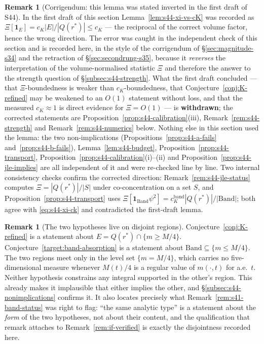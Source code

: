 \documentclass[11pt]{article}
\theoremstyle{definition}
\newtheorem{remark}[theorem]{Remark}
\theoremstyle{remark}
\begin{document}
\begin{remark}[Corrigendum: this lemma was stated inverted in the first draft
  of S44]\label{rem:s44-corrigendum}
  In the first draft of this section Lemma~\ref{lem:s44-xi-vs-cK} was recorded
  as $\Xi[\mathbf{1}_E]=c_K|E|/|Q(r^*)|\leq c_K$ --- the reciprocal of the
  correct volume factor, hence the wrong direction. The error was caught in
  the independent check of this section and is recorded here, in the style of
  the corrigendum of \S\ref{sec:magnitude-s34} and the retraction of
  \S\ref{sec:secondrung-s35}, because it \emph{reverses} the interpretation of
  the volume-normalised statistic $\Xi$ and therefore the answer to the
  strength question of \S\ref{subsec:s44-strength}. What the first draft
  concluded --- that $\Xi$-boundedness is weaker than $c_K$-boundedness, that
  Conjecture~\ref{conj:K-refined} may be weakened to an $O(1)$ statement
  without loss, and that the measured $c_K\approx1$ is direct evidence for
  $\Xi=O(1)$ --- is \textbf{withdrawn}; the corrected statements are
  Proposition~\ref{prop:s44-calibration}(iii),
  Remark~\ref{rem:s44-strength} and Remark~\ref{rem:s44-numerics} below.
  Nothing else in this section used the lemma: the two non-implications
  (Propositions~\ref{prop:s44-a-fails} and~\ref{prop:s44-b-fails}),
  Lemma~\ref{lem:s44-budget}, Proposition~\ref{prop:s44-transport},
  Proposition~\ref{prop:s44-calibration}(i)--(ii) and
  Proposition~\ref{prop:s44-jle-implies} are all independent of it and were
  re-checked line by line. Two internal consistency checks confirm the
  corrected direction: Remark~\ref{rem:s44-jle-status} computes
  $\Xi=|Q(r^*)|/|S|$ under co-concentration on a set $S$, and
  Proposition~\ref{prop:s44-transport} uses
  $\Xi[\mathbf{1}_{\mathrm{Band}}\psi^2]
  =c_K^{\mathrm{band}}|Q(r^*)|/|\mathrm{Band}|$; both agree with
  \eqref{eq:s44-xi-ck} and contradicted the first-draft lemma.
\end{remark}

\begin{remark}[The two hypotheses live on disjoint regions]
  \label{rem:s44-disjoint}
  Conjecture~\ref{conj:K-refined} is a statement about
  $E=Q(r^*)\cap\{m\geq M/4\}$. Conjecture~\ref{target:band-absorption} is a
  statement about $\mathrm{Band}\subseteq\{m\leq M/4\}$. The two regions meet
  only in the level set $\{m=M/4\}$, which carries no five-dimensional measure
  whenever $M(t)/4$ is a regular value of $m(\cdot,t)$ for a.e.\ $t$. Neither
  hypothesis constrains any integral supported in the other's region. This
  already makes it implausible that either implies the other, and
  \S\ref{subsec:s44-nonimplications} confirms it. It also locates precisely
  what Remark~\ref{rem:s41-band-status} was right to flag: ``the same analytic
  type'' is a statement about the \emph{form} of the two hypotheses, not about
  their content, and the qualification that remark attaches to
  Remark~\ref{rem:if-verified} is exactly the disjointness recorded here.
\end{remark}
\end{document}
